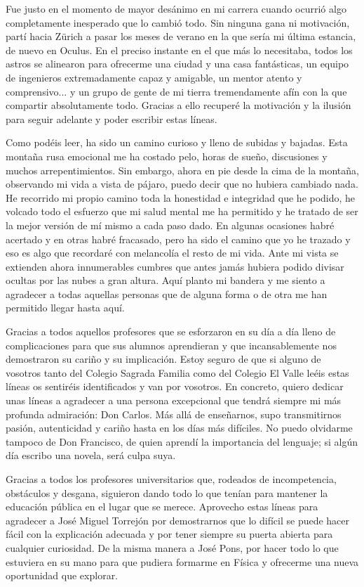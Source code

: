 Fue justo en el momento de mayor desánimo en mi carrera cuando ocurrió algo completamente inesperado que lo cambió todo. Sin ninguna gana ni motivación, partí hacia Zürich a pasar los meses de verano en la que sería mi última estancia, de nuevo en Oculus. En el preciso instante en el que más lo necesitaba, todos los astros se alinearon para ofrecerme una ciudad y una casa fantásticas, un equipo de ingenieros extremadamente capaz y amigable, un mentor atento y comprensivo... y un grupo de gente de mi tierra tremendamente afín con la que compartir absolutamente todo. Gracias a ello recuperé la motivación y la ilusión para seguir adelante y poder escribir estas líneas.

Como podéis leer, ha sido un camino curioso y lleno de subidas y bajadas. Esta montaña rusa emocional me ha costado pelo, horas de sueño, discusiones y muchos arrepentimientos. Sin embargo, ahora en pie desde la cima de la montaña, observando mi vida a vista de pájaro, puedo decir que no hubiera cambiado nada. He recorrido mi propio camino toda la honestidad e integridad que he podido, he volcado todo el esfuerzo que mi salud mental me ha permitido y he tratado de ser la mejor versión de mí mismo a cada paso dado. En algunas ocasiones habré acertado y en otras habré fracasado, pero ha sido el camino que yo he trazado y eso es algo que recordaré con melancolía el resto de mi vida. Ante mi vista se extienden ahora innumerables cumbres que antes jamás hubiera podido divisar ocultas por las nubes a gran altura. Aquí planto mi bandera y me siento a agradecer a todas aquellas personas que de alguna forma o de otra me han permitido llegar hasta aquí.

Gracias a todos aquellos profesores que se esforzaron en su día a día lleno de complicaciones para que sus alumnos aprendieran y que incansablemente nos demostraron su cariño y su implicación. Estoy seguro de que si alguno de vosotros tanto del Colegio Sagrada Familia como del Colegio El Valle leéis estas líneas os sentiréis identificados y van por vosotros. En concreto, quiero dedicar unas líneas a agradecer a una persona excepcional que tendrá siempre mi más profunda admiración: Don Carlos. Más allá de enseñarnos, supo transmitirnos pasión, autenticidad y cariño hasta en los días más difíciles. No puedo olvidarme tampoco de Don Francisco, de quien aprendí la importancia del lenguaje; si algún día escribo una novela, será culpa suya.

Gracias a todos los profesores universitarios que, rodeados de incompetencia, obstáculos y desgana, siguieron dando todo lo que tenían para mantener la educación pública en el lugar que se merece. Aprovecho estas líneas para agradecer a José Miguel Torrejón por demostrarnos que lo difícil se puede hacer fácil con la explicación adecuada y por tener siempre su puerta abierta para cualquier curiosidad. De la misma manera a José Pons, por hacer todo lo que estuviera en su mano para que pudiera formarme en Física y ofrecerme una nueva oportunidad que explorar.

